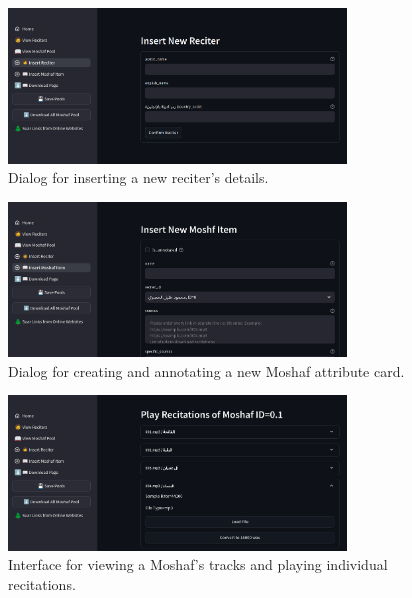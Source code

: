 \begin{figure}[H]
\centering
\includegraphics[width=0.8\textwidth]{../figures/ui_insert_new_reciter.png}
\caption{Dialog for inserting a new reciter's details.}
\label{fig:ui_new_reciter}
\end{figure}

\begin{figure}[H]
\centering
\includegraphics[width=0.8\textwidth]{../figures/ui_inset_new_mohaf.png}
\caption{Dialog for creating and annotating a new Moshaf attribute card.}
\label{fig:ui_new_moshaf}
\end{figure}

\begin{figure}[H]
\centering
\includegraphics[width=0.8\textwidth]{../figures/ui_play_recitatins.png}
\caption{Interface for viewing a Moshaf's tracks and playing individual recitations.}
\label{fig:ui_play}
\end{figure}









